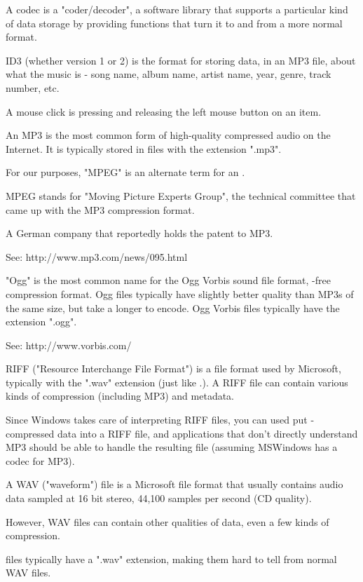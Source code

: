 \begin{helpglossary}
\setfooter{\thepage}{}{}{}{}{\thepage}


\label{codec}
A codec is a "coder/decoder", a software library that supports a
particular kind of data storage by providing functions that
turn it to and from a more normal format.


\label{id3}
ID3 (whether version 1 or 2) is the format for storing data, in
an MP3 file, about what the music is - song name, album name,
artist name, year, genre, track number, etc.


\label{mouseclick}
A mouse click is pressing and releasing the left mouse button on an item.


\label{mp3}
An MP3 is the most common form of high-quality compressed audio
on the Internet.  It is typically stored in files with the extension
".mp3".


\label{mpeg}
For our purposes, "MPEG" is an alternate term for an
.

MPEG stands for "Moving Picture Experts Group", the technical
committee that came up with the MP3 compression format.


\label{Fraunhofer}
A German company that reportedly holds the patent to MP3.

See:  http://www.mp3.com/news/095.html


\label{ogg}
"Ogg" is the most common name for the Ogg Vorbis sound file format,
-free compression format.  Ogg
files typically have slightly
better quality than MP3s of the same size, but take a longer
to encode.  Ogg Vorbis files typically have the extension ".ogg".

See: http://www.vorbis.com/


\label{riff}
RIFF ("Resource Interchange File Format") is a file format used by
Microsoft, typically with the ".wav" extension (just like
.).  A RIFF file can contain
various kinds of compression (including MP3) and metadata.

Since Windows takes care of interpreting RIFF files, you can used put
-compressed data into a RIFF file, and applications
that don't directly understand MP3 should be able to handle the
resulting file (assuming MSWindows has a codec for MP3).


\label{wav}
A WAV ("waveform") file is a Microsoft file format that usually
contains audio data sampled at 16 bit stereo, 44,100 samples per
second (CD quality).

However, WAV files can contain other qualities of data, even
a few kinds of compression.

 files typically have a ".wav"
extension, making them hard to tell from normal WAV files.


\end{helpglossary}

\setfooter{\thepage}{}{}{}{}{\thepage}
\printindex



